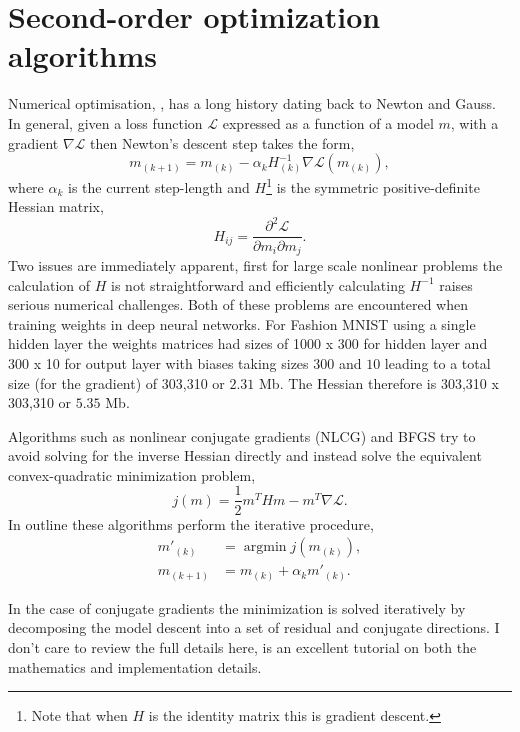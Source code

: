 \documentclass[11pt,twocolumn]{article}
\DeclareMathOperator*{\argmin}{argmin}
\begin{document}
\section{Second-order optimization algorithms}\label{sec:optim}
Numerical optimisation, \cite{Nocedal:Wright}, has a long history dating back to Newton and Gauss. In general, given a loss function $\mathcal{L}$ expressed as a function of a model $m$, with a gradient $\nabla \mathcal{L}$ then Newton's descent step takes the form,
\begin{equation}
m_{(k+1)}=m_{(k)}- \alpha_{k} H_{(k)}^{-1} \nabla \mathcal{L}(m_{(k)}),
\end{equation}
where $\alpha_k$ is the current step-length and $H$\footnote{Note that when $H$ is the identity matrix this is gradient descent.} is the symmetric positive-definite Hessian matrix,
\begin{equation}
H_{ij}=\frac{\partial^2 \mathcal{L}}{\partial m_i \partial m_j}.
\end{equation}
Two issues are immediately apparent, first for large scale nonlinear problems the calculation of $H$ is not straightforward and efficiently calculating $H^{-1}$ raises serious numerical challenges. Both of these problems are encountered when training weights in deep neural networks. For Fashion MNIST using a single hidden layer the weights matrices had sizes of 1000 x 300 for hidden layer and 300 x 10 for output layer with biases taking sizes $300$ and $10$ leading to a total size (for the gradient) of 303,310 or $2.31$ Mb. The Hessian therefore is 303,310  x 303,310 or $5.35$ Mb. 

Algorithms such as nonlinear conjugate gradients (NLCG) and BFGS try to avoid solving for the inverse Hessian directly and instead solve the equivalent convex-quadratic minimization problem, 
\begin{equation}
j(m)=\frac{1}{2}m^THm-m^T\nabla \mathcal{L}.\label{my_obj}
\end{equation}   
In outline these algorithms perform the iterative procedure, 
\begin{align}
m'_{(k)}&=\argmin{j(m_{(k)})},\\
m_{(k+1)}&=m_{(k)}+\alpha_{k} m'_{(k)}.
\end{align}

In the case of conjugate gradients the minimization is solved iteratively by  decomposing the model descent into a set of residual and conjugate directions. I don't care to review the full details here, \cite{Shew:CGnopain} is an excellent tutorial on both the mathematics and implementation details.
\end{document}
